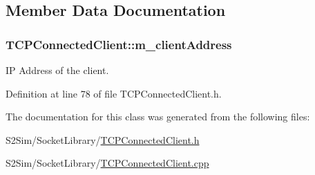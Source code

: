 \subsection{Member Data Documentation}
\hypertarget{class_t_c_p_connected_client_a7ef3342e4792893fa7c653a5f1a02ffe}{
\subsubsection[{m\-\_\-client\-Address}]{ T\-C\-P\-Connected\-Client\-::m\-\_\-client\-Address\hspace{0.3cm}{\ttfamily [private]}}}\label{class_t_c_p_connected_client_a7ef3342e4792893fa7c653a5f1a02ffe}


I\-P Address of the client. 



Definition at line 78 of file T\-C\-P\-Connected\-Client.\-h.



The documentation for this class was generated from the following files\-:\begin{DoxyCompactItemize}
\item 
S2\-Sim/\-Socket\-Library/\hyperlink{_t_c_p_connected_client_8h}{T\-C\-P\-Connected\-Client.\-h}\item 
S2\-Sim/\-Socket\-Library/\hyperlink{_t_c_p_connected_client_8cpp}{T\-C\-P\-Connected\-Client.\-cpp}\end{DoxyCompactItemize}
